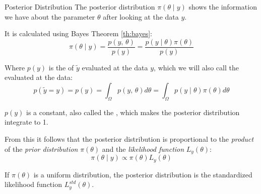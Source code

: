 \begin{definition}{Posterior Distribution}{}{}
	The posterior distribution $\pi(\theta \mid y)$ shows the information we have
	about the parameter $\theta$ after looking at the data $y$.

	It is calculated using Bayes Theorem \ref{th:bayes}:
	\begin{equation}
		\pi(\theta \mid y) = \frac{p(y,\,\theta)}{p(y)} = \frac{p(y \mid \theta) \pi(\theta)}{p(y)}
	\end{equation}

	Where $p(y)$ is the  of $\tilde{y}$ evaluated at the
	data $y$, which we will also call the  evaluated at
	the data:
	\begin{equation}
		p(\tilde y = y) = p(y) = \int_{\Omega} p(y,\,\theta) d\theta = \int_{\Omega} p(y \mid \theta) \pi(\theta) d\theta
	\end{equation}

	\begin{note}
		$p(y)$ is a constant, also called the , which
		makes the posterior distribution integrate to 1.
	\end{note}

	From this it follows that the posterior distribution is proportional to the
	\emph{product} of the \emph{prior distribution} $\pi(\theta)$ and the
	\emph{likelihood function} $L_y(\theta)$:
	\begin{equation}
		\pi(\theta \mid y) \propto \pi(\theta) L_y(\theta)
	\end{equation}
\end{definition}

\begin{note}
	If $\pi(\theta)$ is a uniform distribution, the posterior distribution is the
	standardized likelihood function $L_y^{std}(\theta)$.
\end{note}

